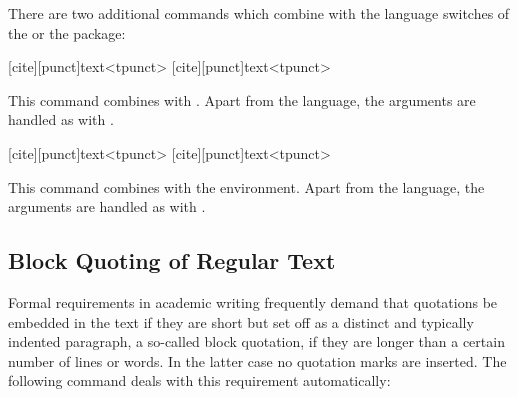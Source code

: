 \documentclass{ltxdockit}[2010/09/26]
\begin{document}
There are two additional commands which combine  with the language switches of the  or the  package:

\begin{ltxsyntax}

[cite][punct]{text}<tpunct>
[cite][punct]{text}<tpunct>

This command combines  with . Apart from the language, the arguments are handled as with .

[cite][punct]{text}<tpunct>
[cite][punct]{text}<tpunct>

This command combines  with the  environment. Apart from the language, the arguments are handled as with .

\end{ltxsyntax}

\subsection{Block Quoting of Regular Text}
\label{bas:blk:reg}

Formal requirements in academic writing frequently demand that quotations be embedded in the text if they are short but set off as a distinct and typically indented paragraph, a so-called block quotation, if they are longer than a certain number of lines or words. In the latter case no quotation marks are inserted. The following command deals with this requirement automatically:
\end{document}
